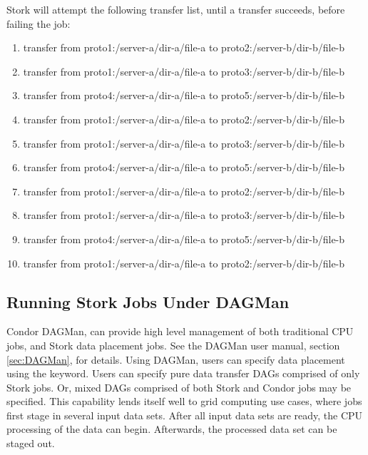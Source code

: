 Stork will attempt the following transfer list, until a transfer succeeds,
before failing the job:
\begin{enumerate}
    \item transfer from 
			proto1:/server-a/dir-a/file-a
            to
			proto2:/server-b/dir-b/file-b
    \item transfer from 
			proto1:/server-a/dir-a/file-a
            to
			proto3:/server-b/dir-b/file-b
    \item transfer from 
			proto4:/server-a/dir-a/file-a
            to
			proto5:/server-b/dir-b/file-b
    \item transfer from 
			proto1:/server-a/dir-a/file-a
            to
			proto2:/server-b/dir-b/file-b
    \item transfer from 
			proto1:/server-a/dir-a/file-a
            to
			proto3:/server-b/dir-b/file-b
    \item transfer from 
			proto4:/server-a/dir-a/file-a
            to
			proto5:/server-b/dir-b/file-b
    \item transfer from 
			proto1:/server-a/dir-a/file-a
            to
			proto2:/server-b/dir-b/file-b
    \item transfer from 
			proto1:/server-a/dir-a/file-a
            to
			proto3:/server-b/dir-b/file-b
    \item transfer from 
			proto4:/server-a/dir-a/file-a
            to
			proto5:/server-b/dir-b/file-b
    \item transfer from 
			proto1:/server-a/dir-a/file-a
            to
			proto2:/server-b/dir-b/file-b
\end{enumerate}

\subsection{\label{sec:Stork-Advanced}Running Stork Jobs Under DAGMan}

Condor DAGMan, can provide high level management of both traditional CPU jobs,
and Stork data placement jobs.  See the DAGMan user manual, section
\ref{sec:DAGMan}, for details.  Using DAGMan, users can specify data placement
using the  keyword.  Users can specify pure data transfer DAGs
comprised of only Stork jobs.  Or, mixed DAGs comprised of both Stork and
Condor jobs may be specified.  This capability lends itself well to grid
computing use cases, where jobs first stage in several input data sets.  After
all input data sets are ready, the CPU processing of the data can begin.
Afterwards, the processed data set can be staged out.

